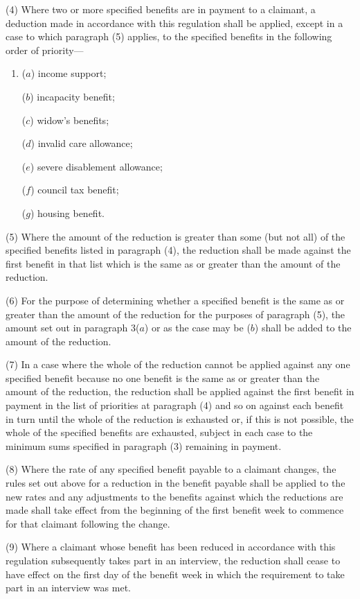 \documentclass[12pt,a4paper]{article}
\begin{document}
(4) Where two or more specified benefits are in payment to a claimant, a deduction made in accordance with this regulation shall be applied, except in a case to which paragraph (5) applies, to the specified benefits in the following order of priority—
\begin{enumerate}\item[]
($a$) income support;

($b$) incapacity benefit;

($c$) widow’s benefits;

($d$) invalid care allowance;

($e$) severe disablement allowance;

($f$) council tax benefit;

($g$) housing benefit.
\end{enumerate}

(5) Where the amount of the reduction is greater than some (but not all) of the specified benefits listed in paragraph (4), the reduction shall be made against the first benefit in that list which is the same as or greater than the amount of the reduction.

(6) For the purpose of determining whether a specified benefit is the same as or greater than the amount of the reduction for the purposes of paragraph (5), the amount set out in paragraph 3($a$)  or as the case may be ($b$)  shall be added to the amount of the reduction.

(7) In a case where the whole of the reduction cannot be applied against any one specified benefit because no one benefit is the same as or greater than the amount of the reduction, the reduction shall be applied against the first benefit in payment in the list of priorities at paragraph (4) and so on against each benefit in turn until the whole of the reduction is exhausted or, if this is not possible, the whole of the specified benefits are exhausted, subject in each case to the minimum sums specified in paragraph (3) remaining in payment.

(8) Where the rate of any specified benefit payable to a claimant changes, the rules set out above for a reduction in the benefit payable shall be applied to the new rates and any adjustments to the benefits against which the reductions are made shall take effect from the beginning of the first benefit week to commence for that claimant following the change.

(9) Where a claimant whose benefit has been reduced in accordance with this regulation subsequently takes part in an interview, the reduction shall cease to have effect on the first day of the benefit week in which the requirement to take part in an interview was met.
\end{document}
